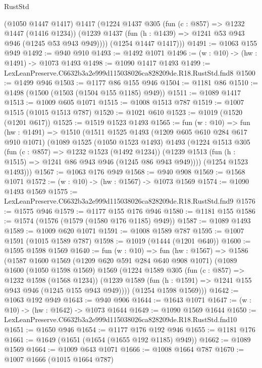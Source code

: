 \begin{lexlean}{RustStd}
\begin{coremodule}
        (@1050 @1447 @1417)
        @1417
        (@1224
          @1437
          @305
          (fun (c : @857) => @1232 @1447 (@1416 @1234))
          (@1239 @1437 (fun (h : @1439) => @1241 @53 @943 @946 (@1245 @53 @943 @949))))
        (@1254 @1447 @1417)))
@1491 := @1063 @155 @949
@1492 := @940 @910
@1493 := @1492 @1071
@1496 := (w : @10) -> (hw : @1491) -> @1073 @1493
@1498 := @1090 @1417 @1493
@1499 := LexLeanPreserve.C6632b3a2e999d115038026ca828209de.R18.RustStd.fnd8
@1500 := @1499 @946
@1503 := @1177 @86 @155 @946
@1504 := @1181 @86
@1510 := @1498 (@1500 (@1503 (@1504 @155 @1185) @949))
@1511 := @1089 @1417
@1513 := @1009 @605 @1071
@1515 := @1008 @1513 @787
@1519 := @1007 @1515 (@1015 @1513 @787)
@1520 := @1021 @610
@1523 := @1019 (@1520 (@1201 @617))
@1525 := @1519 @1523 @1493
@1565 := fun (w : @10) =>
  fun (hw : @1491) =>
  @1510
    (@1511
      @1525
      @1493
      (@1209 @605 @610 @284 @617 @910 @1071)
      (@1089
        @1525
        (@1050 @1523 @1493)
        @1493
        (@1224
          @1513
          @305
          (fun (c : @857) => @1232 @1523 (@1492 @1234))
          (@1239 @1513 (fun (h : @1515) => @1241 @86 @943 @946 (@1245 @86 @943 @949))))
        (@1254 @1523 @1493)))
@1567 := @1063 @176 @949
@1568 := @940 @908
@1569 := @1568 @1071
@1572 := (w : @10) -> (hw : @1567) -> @1073 @1569
@1574 := @1090 @1493 @1569
@1575 := LexLeanPreserve.C6632b3a2e999d115038026ca828209de.R18.RustStd.fnd9
@1576 := @1575 @946
@1579 := @1177 @155 @176 @946
@1580 := @1181 @155
@1586 := @1574 (@1576 (@1579 (@1580 @176 @1185) @949))
@1587 := @1089 @1493
@1589 := @1009 @620 @1071
@1591 := @1008 @1589 @787
@1595 := @1007 @1591 (@1015 @1589 @787)
@1598 := @1019 (@1444 (@1201 @640))
@1600 := @1595 @1598 @1569
@1640 := fun (w : @10) =>
  fun (hw : @1567) =>
  @1586
    (@1587
      @1600
      @1569
      (@1209 @620 @591 @284 @640 @908 @1071)
      (@1089
        @1600
        (@1050 @1598 @1569)
        @1569
        (@1224
          @1589
          @305
          (fun (c : @857) => @1232 @1598 (@1568 @1234))
          (@1239 @1589 (fun (h : @1591) => @1241 @155 @943 @946 (@1245 @155 @943 @949))))
        (@1254 @1598 @1569)))
@1642 := @1063 @192 @949
@1643 := @940 @906
@1644 := @1643 @1071
@1647 := (w : @10) -> (hw : @1642) -> @1073 @1644
@1649 := @1090 @1569 @1644
@1650 := LexLeanPreserve.C6632b3a2e999d115038026ca828209de.R18.RustStd.fnd10
@1651 := @1650 @946
@1654 := @1177 @176 @192 @946
@1655 := @1181 @176
@1661 := @1649 (@1651 (@1654 (@1655 @192 @1185) @949))
@1662 := @1089 @1569
@1664 := @1009 @643 @1071
@1666 := @1008 @1664 @787
@1670 := @1007 @1666 (@1015 @1664 @787)

\end{coremodule}
\end{lexlean}
